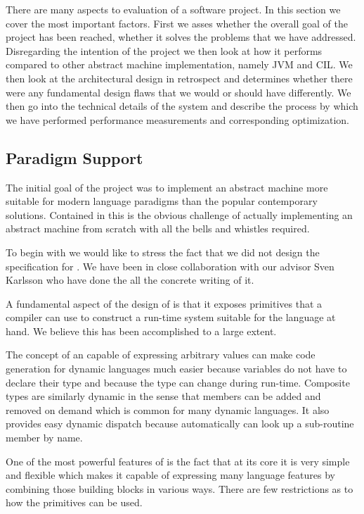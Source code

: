 There are many aspects to evaluation of a software project. In this section we
cover the most important factors. First we asses whether the overall goal of the
project has been reached, whether it solves the problems that we have
addressed. Disregarding the intention of the project we then look at how it
performs compared to other abstract machine implementation, namely JVM and
CIL. We then look at the architectural design in retrospect and determines
whether there were any fundamental design flaws that we would or should have
differently. We then go into the technical details of the system and describe
the process by which we have performed performance measurements and
corresponding optimization.

\subsection{Paradigm Support}

The initial goal of the project was to implement an abstract machine more
suitable for modern language paradigms than the popular contemporary
solutions. Contained in this is the obvious challenge of actually implementing
an abstract machine from scratch with all the bells and whistles required.

To begin with we would like to stress the fact that we did not design the
specification for \thename{}. We have been in close collaboration with our
advisor Sven Karlsson who have done the all the concrete writing of it.

A fundamental aspect of the design of \thename{} is that it exposes primitives
that a compiler can use to construct a run-time system suitable for the language
at hand. We believe this has been accomplished to a large extent.

The concept of an  capable of expressing arbitrary values can make
code generation for dynamic languages much easier because variables do not have
to declare their type and because the type can change during run-time. Composite
types are similarly dynamic in the sense that members can be added and removed
on demand which is common for many dynamic languages. It also provides easy
dynamic dispatch because \thename{} automatically can look up a sub-routine
member by name.

One of the most powerful features of \thename{} is the fact that at its core it
is very simple and flexible which makes it capable of expressing many language
features by combining those building blocks in various ways. There are few
restrictions as to how the primitives can be used.


